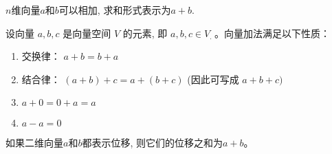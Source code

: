 \begin{definition}[向量加法]
    $n$维向量$a$和$b$可以相加, 求和形式表示为$a + b$.
\end{definition}

\begin{theorem}
    设向量 \( a, {b}, {c} \) 是向量空间 \( V \) 的元素, 即 \( a, {b}, {c} \in V_{\text {.  }} \)。向量加法满足以下性质：

    \begin{enumerate}
        \item 交换律： \( a+b=b+a \)
        \item 结合律： \( (a+b)+c=a+(b+c) \) (因此可写成 \( a+{b}+{c}) \)
        \item \( a+0=0+a=a \)
        \item \( a-a=0 \)
    \end{enumerate}
\end{theorem}

\begin{corollary}[向量位移相加]
    如果二维向量$a$和$b$都表示位移, 则它们的位移之和为$a + b$。
\end{corollary}


